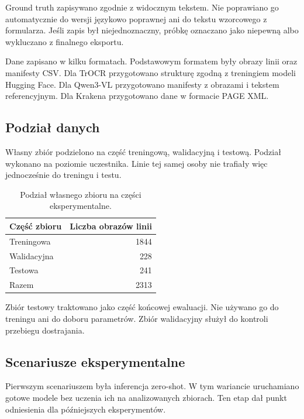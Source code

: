 Ground truth zapisywano zgodnie z widocznym tekstem. Nie poprawiano go automatycznie do wersji językowo poprawnej ani do tekstu wzorcowego z formularza. Jeśli zapis był niejednoznaczny, próbkę oznaczano jako niepewną albo wykluczano z finalnego eksportu.

Dane zapisano w kilku formatach. Podstawowym formatem były obrazy linii oraz manifesty CSV. Dla TrOCR przygotowano strukturę zgodną z treningiem modeli Hugging Face. Dla Qwen3-VL przygotowano manifesty z obrazami i tekstem referencyjnym. Dla Krakena przygotowano dane w formacie PAGE XML.

\subsection{Podział danych}
\label{subsec:podzial-danych-eksperymenty}

Własny zbiór podzielono na część treningową, walidacyjną i testową. Podział wykonano na poziomie uczestnika. Linie tej samej osoby nie trafiały więc jednocześnie do treningu i testu.

\begin{table}[H]
    \centering
    \caption{Podział własnego zbioru na części eksperymentalne.}
    \label{tab:podzial-wlasnego-zbioru-eksperymenty}
    \begin{tabular}{lr}
        \hline
        Część zbioru & Liczba obrazów linii \\
        \hline
        Treningowa & 1844 \\
        Walidacyjna & 228 \\
        Testowa & 241 \\
        \hline
        Razem & 2313 \\
        \hline
    \end{tabular}
\end{table}

Zbiór testowy traktowano jako część końcowej ewaluacji. Nie używano go do treningu ani do doboru parametrów. Zbiór walidacyjny służył do kontroli przebiegu dostrajania.

\subsection{Scenariusze eksperymentalne}
\label{subsec:scenariusze-eksperymentalne}

Pierwszym scenariuszem była inferencja zero-shot. W tym wariancie uruchamiano gotowe modele bez uczenia ich na analizowanych zbiorach. Ten etap dał punkt odniesienia dla późniejszych eksperymentów.

